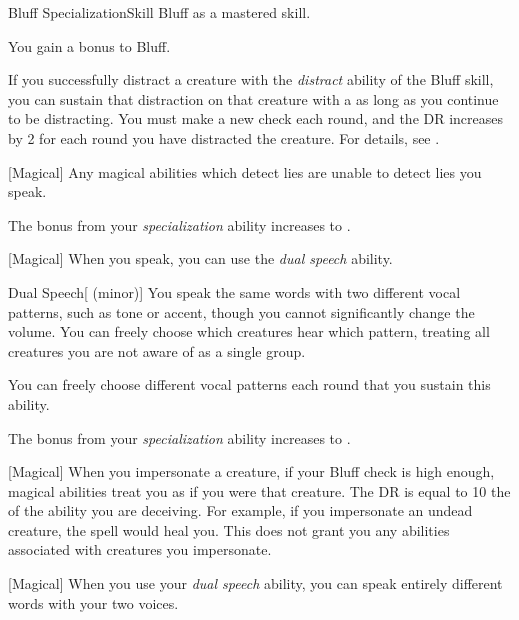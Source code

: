     \begin{feat}{Bluff Specialization}{Skill}
        \featpre Bluff as a mastered skill.

         You gain a  bonus to Bluff.

         If you successfully distract a creature with the \textit{distract} ability of the Bluff skill, you can sustain that distraction on that creature with a  as long as you continue to be distracting.
        You must make a new check each round, and the DR increases by 2 for each round you have distracted the creature.
        For details, see .

        [Magical] Any magical abilities which detect lies are unable to detect lies you speak.

         The bonus from your \textit{specialization} ability increases to .

        [Magical] When you speak, you can use the \textit{dual speech} ability.
        \begin{apability}{Dual Speech}[ (minor)]
            You speak the same words with two different vocal patterns, such as tone or accent, though you cannot significantly change the volume.
            You can freely choose which creatures hear which pattern, treating all creatures you are not aware of as a single group.

            You can freely choose different vocal patterns each round that you sustain this ability.
        \end{apability}

         The bonus from your \textit{specialization} ability increases to .

        [Magical] When you impersonate a creature, if your Bluff check is high enough, magical abilities treat you as if you were that creature.
        The DR is equal to 10 \add the  of the ability you are deceiving.
        For example, if you impersonate an undead creature, the  spell would heal you.
        This does not grant you any abilities associated with creatures you impersonate.

        [Magical] When you use your \textit{dual speech} ability, you can speak entirely different words with your two voices.
    \end{feat}

